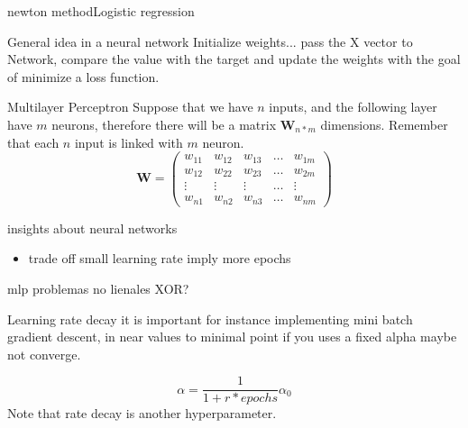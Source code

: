 \documentclass{beamer}
\begin{document}
\begin{frame}{newton method}{Logistic regression}


\end{frame}

\begin{frame}{General idea in a neural network}
Initialize weights...
pass the X vector to Network, compare the value with the target and update the weights with the goal of minimize a loss function.

\end{frame}



\begin{frame}{Multilayer Perceptron}
Suppose that we have $n$ inputs, and the following layer have $m$ neurons, therefore there will be  a matrix $\bm{W}_{n*m}$ dimensions.  Remember that each $n$ input is linked with $m$ neuron.
\[
\bm{W} = \begin{pmatrix}
w_{11} & w_{12} & w_{13} & \hdots &  w_{1m} \\
w_{12} & w_{22} & w_{23} & \hdots &  w_{2m} \\
\vdots & \vdots & \vdots & \hdots &  \vdots \\
w_{n1} & w_{n2} & w_{n3} & \hdots &  w_{nm}
\end{pmatrix}
\]
\end{frame}





\begin{frame}{insights about neural networks}
\begin{itemize}
\item trade off small learning rate imply more epochs
\end{itemize}
\end{frame}


\begin{frame}{mlp}
problemas no lienales XOR?


\end{frame}







\begin{frame}{Learning rate decay}
it is important for instance implementing mini batch gradient descent, in near values to minimal point if you uses a fixed alpha maybe not converge.

\begin{equation}
\alpha = \frac{1}{1 + r * epochs } \alpha_{0}
\end{equation}
Note that rate decay is another hyperparameter.
\end{frame}
\end{document}
